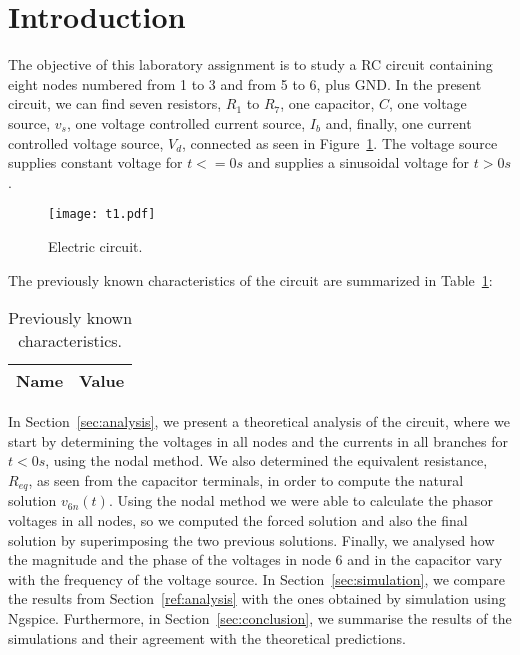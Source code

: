 \section{Introduction}
\label{sec:introduction}

The objective of this laboratory assignment is to study a RC circuit containing eight nodes numbered from 1 to 3 and from 5 to 6, plus GND. In the present circuit, we can find seven resistors, $R_1$ to $R_7$, one capacitor, $C$, one voltage source, $v_s$, one voltage controlled current source, $I_b$ and, finally, one current controlled voltage source, $V_d$, connected as seen in Figure~\ref{fig:t1}. The voltage source supplies constant voltage for $t <= 0s$ and supplies a sinusoidal voltage for $t > 0s$.

\begin{figure}[H] \centering
\texttt{[image: t1.pdf]}
\caption{Electric circuit.}
\label{fig:t1}
\end{figure}

The previously known characteristics of the circuit are summarized in Table~\ref{tab:datatab}:

\begin{table}[H]
  \centering
  \begin{tabular}{|l|r|}
    \hline    
    {\bf Name} & {\bf Value} \\ \hline
    
  \end{tabular}
  \caption{Previously known characteristics.}
  \label{tab:datatab}
\end{table}

In Section~\ref{sec:analysis}, we present a theoretical analysis of the circuit, where we start by determining the voltages in all nodes and the currents in all branches for $t<0s$, using the nodal method. We also determined the equivalent resistance, $R_{eq}$, as seen from the capacitor terminals, in order to compute the natural solution $v_{6n}(t)$. Using the nodal method we were able to calculate the phasor voltages in all nodes, so we computed the forced solution and also the final solution by superimposing the two previous solutions. Finally, we analysed how the magnitude and the phase of the voltages in node 6 and in the capacitor vary with the frequency of the voltage source. In Section~\ref{sec:simulation}, we compare the results from Section~\ref{ref:analysis} with the ones obtained by simulation using Ngspice. Furthermore, in Section~\ref{sec:conclusion}, we summarise the results of the simulations and their agreement with the theoretical predictions.
